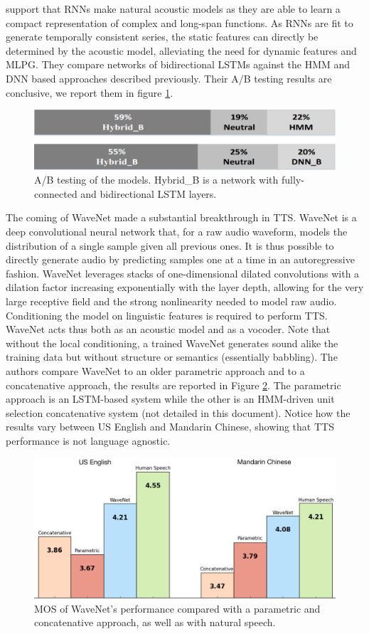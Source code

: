 \documentclass[a4paper, oneside, 12pt, english]{article}
\begin{document}
\citep{BDLSTMTTS} support that RNNs make natural acoustic models as they are able to learn a compact representation of complex and long-span functions. As RNNs are fit to generate temporally consistent series, the static features can directly be determined by the acoustic model, alleviating the need for dynamic features and MLPG. They compare networks of bidirectional LSTMs against the HMM and DNN based approaches described previously. Their A/B testing results are conclusive, we report them in figure \ref{dblstm_subjective}.

\begin{figure}[h]
	\centering
	\includegraphics[width=0.6\linewidth]{images/bdlstm_subjective.png}
	\caption{A/B testing of the models. Hybrid\_B is a network with fully-connected and bidirectional LSTM layers.}
	\label{dblstm_subjective}
\end{figure}

The coming of WaveNet \citep{WaveNet} made a substantial breakthrough in TTS. WaveNet is a deep convolutional neural network that, for a raw audio waveform, models the distribution of a single sample given all previous ones. It is thus possible to directly generate audio by predicting samples one at a time in an autoregressive fashion. WaveNet leverages stacks of one-dimensional dilated convolutions with a dilation factor increasing exponentially with the layer depth, allowing for the very large receptive field and the strong nonlinearity needed to model raw audio. Conditioning the model on linguistic features is required to perform TTS. WaveNet acts thus both as an acoustic model and as a vocoder. Note that without the local conditioning, a trained WaveNet generates sound alike the training data but without structure or semantics (essentially babbling). 
The authors compare WaveNet to an older parametric approach and to a concatenative approach, the results are reported in Figure \ref{wavenet_results}. The parametric approach is an LSTM-based system while the other is an HMM-driven unit selection concatenative system (not detailed in this document). Notice how the results vary between US English and Mandarin Chinese, showing that TTS performance is not language agnostic.

\begin{figure}[h]
	\centering
	\includegraphics[width=.75\linewidth]{images/wavenet_results_chart.png}
	\caption{MOS of WaveNet's performance compared with a parametric and concatenative approach, as well as with natural speech.}
	\label{wavenet_results}
\end{figure}
\end{document}
